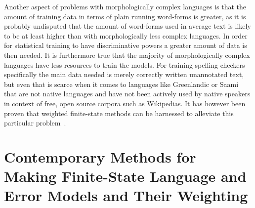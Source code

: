 \documentclass[a4paper,12pt]{article}
\begin{document}
Another aspect of problems with morphologically complex languages is that the
amount of training data in terms of plain running word-forms is greater, as it
is probably undisputed that the amount of word-forms used in average text is
likely to be at least higher than with morphologically less complex languages.
In order for statistical training to have discriminative powers a greater
amount of data is then needed. It is furthermore true that the majority of
morphologically complex languages have less resources to train the models.  For
training spelling checkers specifically the main data needed is merely
correctly written unannotated text, but even that is scarce when it comes to
languages like Greenlandic or Saami that are not native languages and have not
been actively used by native speakers in context of free, open source corpora
such as Wikipedias. It has however been proven that weighted finite-state
methods can be harnessed to alleviate this particular
problem~\cite{pirinen2010finitestate}.


\section{Contemporary Methods for Making Finite-State Language and Error Models
and Their Weighting}
\label{sec:methods}
\end{document}
